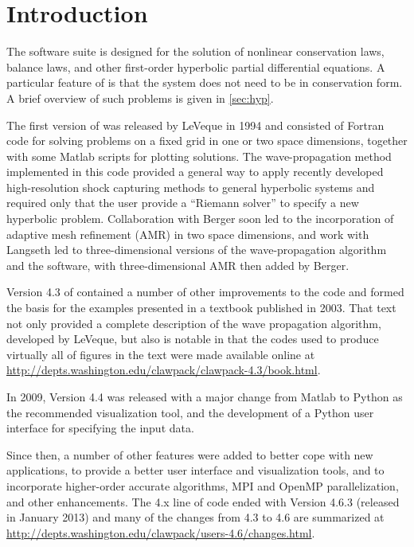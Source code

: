 %
%
%

\section{Introduction}\label{sec:intro}

The \clawpack software suite \cite{clawpack}
is designed for the solution of nonlinear conservation laws, balance laws,
and other first-order hyperbolic partial differential
equations. A particular feature of \clawpack is that the system does not
need to be in conservation form.
A brief overview of such problems is given in \cref{sec:hyp}.

The first version of \clawpack was released by LeVeque in 1994
\cite{clawpack-v1} and consisted of Fortran code for solving problems on a
fixed grid in one or two space dimensions, together with some Matlab scripts
for plotting solutions. The wave-propagation method implemented
in this code provided a general way to apply recently developed
high-resolution shock capturing methods to general hyperbolic systems and
required only that the user provide a ``Riemann solver'' to specify a new
hyperbolic problem.
Collaboration with Berger \cite{mjb-rjl:amrclaw}
soon led to the incorporation of adaptive mesh refinement (AMR) in two space
dimensions, and work with Langseth \cite{jol-rjl:3d, jol:thesis}
led to three-dimensional versions of the wave-propagation algorithm and the
software, with three-dimensional AMR then added by Berger.

Version 4.3 of \clawpack contained a number of other improvements to
the code and formed the basis for the examples presented in a textbook
\cite{rjl:fvmhp} published in 2003.  That text not only provided a
complete description of the wave propagation algorithm, developed by LeVeque,
but also is notable in that the codes used to produce virtually all of figures
in the text were made available online \cite{rjl:fvmhp}
at \url{http://depts.washington.edu/clawpack/clawpack-4.3/book.html}.

In 2009, \clawpack Version 4.4 was released with a major change from Matlab
to Python as the recommended visualization tool, and the development
of a Python user interface for specifying the input data.

Since then, a number of other features were added to better cope with new
applications, to provide a better user interface and visualization tools, and to
incorporate higher-order accurate algorithms, MPI and OpenMP parallelization, and
other enhancements. The \clawpack 4.x line of code ended with Version 4.6.3
(released in January 2013) and
many of the changes from 4.3 to 4.6 are summarized at
\url{http://depts.washington.edu/clawpack/users-4.6/changes.html}.

